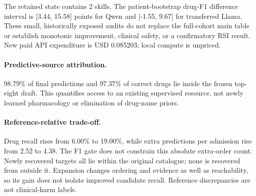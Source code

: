 The retained state contains 2 skills. The patient-bootstrap drug-F1 difference interval is [3.44, 15.58] points for Qwen and [-1.55, 9.67] for transferred Llama. These small, historically exposed audits do not replace the full-cohort main table or establish monotonic improvement, clinical safety, or a confirmatory RSI result. New paid API expenditure is USD 0.085203; local compute is unpriced.

\paragraph{Predictive-source attribution.} 98.79\% of final predictions and 97.37\% of correct drugs lie inside the frozen top-eight draft. This quantifies access to an existing supervised resource, not newly learned pharmacology or elimination of drug-name priors.

\paragraph{Reference-relative trade-off.} Drug recall rises from 6.00\% to 19.00\%, while extra predictions per admission rise from 2.52 to 4.38. The F1 gate does not constrain this absolute extra-order count. Newly recovered targets all lie within the original catalogue; none is recovered from outside it. Expansion changes ordering and evidence as well as reachability, so its gain does not isolate improved candidate recall. Reference discrepancies are not clinical-harm labels.

